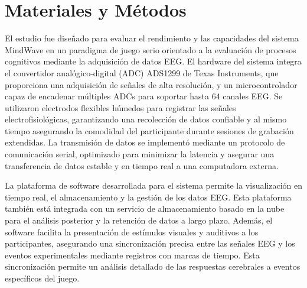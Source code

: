 \section{Materiales y Métodos}



El estudio fue diseñado para evaluar el rendimiento y las capacidades del sistema MindWave en un paradigma de juego serio orientado a la evaluación de procesos cognitivos mediante la adquisición de datos EEG. El hardware del sistema integra el convertidor analógico-digital (ADC) ADS1299 de Texas Instruments, que proporciona una adquisición de señales de alta resolución, y un microcontrolador capaz de encadenar múltiples ADCs para soportar hasta 64 canales EEG. Se utilizaron electrodos flexibles húmedos para registrar las señales electrofisiológicas, garantizando una recolección de datos confiable y al mismo tiempo asegurando la comodidad del participante durante sesiones de grabación extendidas. La transmisión de datos se implementó mediante un protocolo de comunicación serial, optimizado para minimizar la latencia y asegurar una transferencia de datos estable y en tiempo real a una computadora externa.

La plataforma de software desarrollada para el sistema permite la visualización en tiempo real, el almacenamiento y la gestión de los datos EEG. Esta plataforma también está integrada con un servicio de almacenamiento basado en la nube para el análisis posterior y la retención de datos a largo plazo. Además, el software facilita la presentación de estímulos visuales y auditivos a los participantes, asegurando una sincronización precisa entre las señales EEG y los eventos experimentales mediante registros con marcas de tiempo. Esta sincronización permite un análisis detallado de las respuestas cerebrales a eventos específicos del juego.